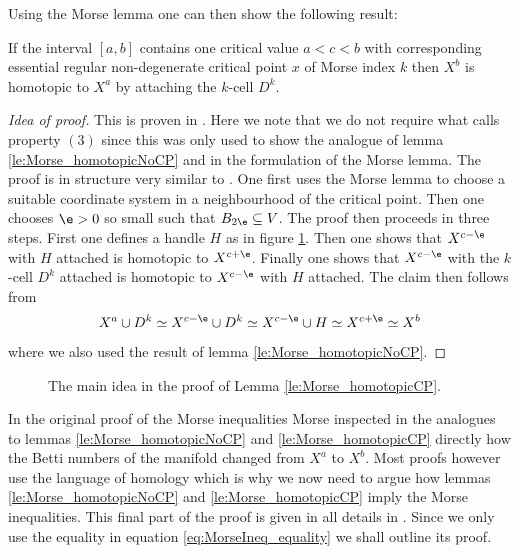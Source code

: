 Using the Morse lemma one can then show the following result:
\begin{lemma}
  \label{le:Morse_homotopicCP}
  If the interval $[a,b]$ contains one critical value $a<c<b$ with corresponding essential regular non-degenerate critical point
  $x$ of Morse index $k$
  then $X^b$ is homotopic to $X^a$ by attaching the $k$-cell
  $D^{k}$.
\end{lemma}
\begin{proof}[Idea of proof]
  This is proven in \cite[Theorem 8]{Handron2002}.
  Here we note that we do not require what \cite{Handron2002} calls property $(3)$
  since this was only used to show the analogue of lemma \ref{le:Morse_homotopicNoCP} and in the formulation of the
  Morse lemma.
  The proof is in structure very similar to \cite{Milnor1963}.
  One first uses the Morse lemma to choose a suitable coordinate system
  in a neighbourhood of the critical point.
  Then one chooses $\e>0$ so small such that $B_{2\e}\subseteq V$.
  The proof then proceeds in three steps.
  First one defines a handle $H$ as in figure \ref{fi:morseIneq_CP}.
  Then one shows that $X^{c-\e}$ with $H$ attached is homotopic to $X^{c+\e}$.
  Finally one shows that $X^{c-\e}$ with the $k$-cell $D^k$ attached is homotopic to
  $X^{c-\e}$ with $H$ attached.
  The claim then follows from
  \begin{align*}
    X^a\cup D^k
    \simeq X^{c-\e}\cup D^k
    \simeq X^{c-\e}\cup H
    \simeq X^{c+\e}
    \simeq X^b
  \end{align*}
  where we also used the result of lemma \ref{le:Morse_homotopicNoCP}.
\end{proof}
\begin{figure}
  \centering
  \begin{subfigure}{0.45\textwidth}
    \centering
    \def\svgwidth{\textwidth}
    
  \end{subfigure}
  \hfill
  \begin{subfigure}{0.45\textwidth}
    \centering
    \def\svgwidth{\textwidth}
    
  \end{subfigure}
  \caption{The main idea in the proof of Lemma \ref{le:Morse_homotopicCP}.}
  \label{fi:morseIneq_CP}
\end{figure}

In the original proof \cite{Morse1925} of the Morse inequalities Morse inspected
in the analogues to lemmas \ref{le:Morse_homotopicNoCP} and \ref{le:Morse_homotopicCP} directly how the Betti numbers of the manifold
changed from $X^a$ to $X^b$.
Most proofs however use the language of homology which
is why we now need to argue how lemmas \ref{le:Morse_homotopicNoCP} and \ref{le:Morse_homotopicCP} imply the Morse inequalities.
This final part of the proof is given in all details in \cite[§I.5]{Milnor1963}.
Since we only use the equality in equation \eqref{eq:MorseIneq_equality} we shall outline its proof.

